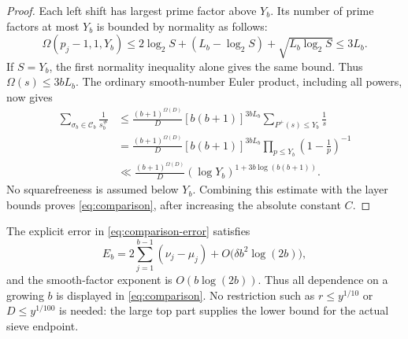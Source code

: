\begin{proof}
Each left shift has largest prime factor above $Y_b$.  Its number
of prime factors at most $Y_b$ is bounded by normality as follows:
\[
 \Omega(p_j-1,1,Y_b)
 \le 2\log_2 S+(L_b-\log_2 S)
       +\sqrt{L_b\log_2 S}\le3L_b.
\]
If $S=Y_b$, the first normality inequality alone gives the same
bound.  Thus $\Omega(s)\le3bL_b$.  The ordinary smooth-number
Euler product, including all powers, now gives
\begin{align*}
 \sum_{\sigma_b\in\mathcal C_b}\frac1{s_b^\#}
 &\le\frac{(b+1)^{\Omega(D)}}D
   [b(b+1)]^{3bL_b}
   \sum_{P^+(s)\le Y_b}\frac1s\\
 &=\frac{(b+1)^{\Omega(D)}}D
   [b(b+1)]^{3bL_b}
   \prod_{p\le Y_b}\left(1-\frac1p\right)^{-1}\\
 &\ll\frac{(b+1)^{\Omega(D)}}D
   (\log Y_b)^{1+3b\log(b(b+1))}.
\end{align*}
No squarefreeness is assumed below $Y_b$.  Combining this estimate
with the layer bounds proves \eqref{eq:comparison}, after increasing
the absolute constant $C$.
\end{proof}

\begin{remark}\label{rem:comparison-uniformity}
The explicit error in \eqref{eq:comparison-error} satisfies
\[
 E_b=2\sum_{j=1}^{b-1}(\nu_j-\mu_j)
       +O\bigl(\delta b^2\log(2b)\bigr),
\]
and the smooth-factor exponent is $O(b\log(2b))$.  Thus all
dependence on a growing $b$ is displayed in
\eqref{eq:comparison}.  No restriction such as
$r\le y^{1/10}$ or $D\le y^{1/100}$ is needed: the large top
part supplies the lower bound for the actual sieve endpoint.
\end{remark}
